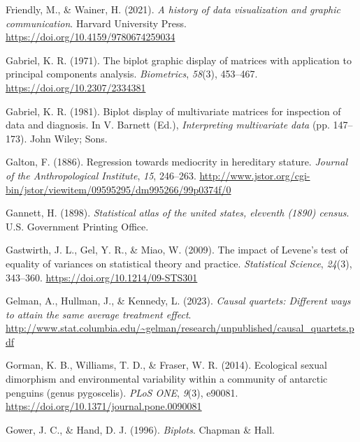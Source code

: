 \documentclass[
  letterpaper,
  10pt,
  krantz2]{krantz}
\newlength{\cslhangindent}
\newlength{\cslentryspacingunit} %
\newenvironment{CSLReferences}[2] %
 {%
  \setlength{\parindent}{0pt}
  \ifodd #1
  \let\oldpar\par
  \def\par{\hangindent=\cslhangindent\oldpar}
  \fi
  \setlength{\parskip}{#2\cslentryspacingunit}
 }%
 {}
\begin{document}
\begin{CSLReferences}{1}{0}
\leavevmode{}%
Friendly, M., \& Wainer, H. (2021). \emph{A history of data
visualization and graphic communication}. Harvard University Press.
\url{https://doi.org/10.4159/9780674259034}

\leavevmode{}%
Gabriel, K. R. (1971). The biplot graphic display of matrices with
application to principal components analysis. \emph{Biometrics},
\emph{58}(3), 453--467. \url{https://doi.org/10.2307/2334381}

\leavevmode{}%
Gabriel, K. R. (1981). Biplot display of multivariate matrices for
inspection of data and diagnosis. In V. Barnett (Ed.),
\emph{Interpreting multivariate data} (pp. 147--173). John Wiley; Sons.

\leavevmode{}%
Galton, F. (1886). Regression towards mediocrity in hereditary stature.
\emph{Journal of the Anthropological Institute}, \emph{15}, 246--263.
\url{http://www.jstor.org/cgi-bin/jstor/viewitem/09595295/dm995266/99p0374f/0}

\leavevmode{}%
Gannett, H. (1898). \emph{Statistical atlas of the united states,
eleventh (1890) census}. U.S. Government Printing Office.

\leavevmode{}%
Gastwirth, J. L., Gel, Y. R., \& Miao, W. (2009). The impact of
{Levene's} test of equality of variances on statistical theory and
practice. \emph{Statistical Science}, \emph{24}(3), 343--360.
\url{https://doi.org/10.1214/09-STS301}

\leavevmode{}%
Gelman, A., Hullman, J., \& Kennedy, L. (2023). \emph{Causal quartets:
Different ways to attain the same average treatment effect}.
\url{http://www.stat.columbia.edu/~gelman/research/unpublished/causal_quartets.pdf}

\leavevmode{}%
Gorman, K. B., Williams, T. D., \& Fraser, W. R. (2014). Ecological
sexual dimorphism and environmental variability within a community of
antarctic penguins (genus pygoscelis). \emph{{PLoS} {ONE}}, \emph{9}(3),
e90081. \url{https://doi.org/10.1371/journal.pone.0090081}

\leavevmode{}%
Gower, J. C., \& Hand, D. J. (1996). \emph{Biplots}. Chapman \& Hall.


\end{CSLReferences}
\end{document}
